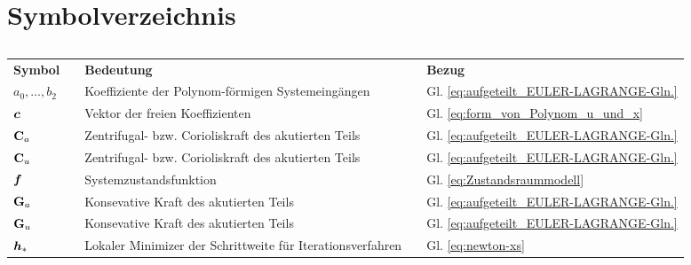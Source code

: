 {}
\chapter*{Symbolverzeichnis}

\section*{}
\begin{small}
	
	
	\noindent
	\hspace{-3mm}
	\begin{supertabular}{lcp{0.62\textwidth}cp{0.19\textwidth}}
		\textbf{Symbol} & \qquad & \textbf{Bedeutung} & \qquad& \textbf{Bezug}\\
		$a_{0},\ldots, b_{2}$ && Koeffiziente der Polynom-förmigen Systemeingängen && Gl. \ref{eq:aufgeteilt_EULER-LAGRANGE-Gln.}\\
		$\boldsymbol c$ && Vektor der freien Koeffizienten && Gl. \ref{eq:form_von_Polynom_u_und_x}\\
		$\mathbf{C}_{a}$ && Zentrifugal- bzw. Corioliskraft des akutierten Teils && Gl. \ref{eq:aufgeteilt_EULER-LAGRANGE-Gln.}\\
		$\mathbf{C}_{u}$ && Zentrifugal- bzw. Corioliskraft des akutierten Teils && Gl. \ref{eq:aufgeteilt_EULER-LAGRANGE-Gln.}\\
		$\boldsymbol f$ && Systemzustandsfunktion && Gl. \ref{eq:Zustandsraummodell}\\
		$\mathbf{G}_{a}$ && Konsevative Kraft des akutierten Teils && Gl. \ref{eq:aufgeteilt_EULER-LAGRANGE-Gln.}\\
		$\mathbf{G}_{u}$ && Konsevative Kraft des akutierten Teils && Gl. \ref{eq:aufgeteilt_EULER-LAGRANGE-Gln.}\\
		$\boldsymbol h_{\ast}$ && Lokaler Minimizer der Schrittweite für Iterationsverfahren && Gl. \ref{eq:newton-xs}\\

\end{supertabular}
\end{small}
